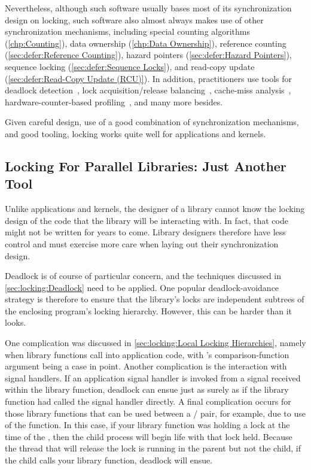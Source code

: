 Nevertheless, although such software usually bases most of its
synchronization design on locking, such software also almost always
makes use of other synchronization mechanisms, including
special counting algorithms (\cref{chp:Counting}),
data ownership (\cref{chp:Data Ownership}),
reference counting (\cref{sec:defer:Reference Counting}),
hazard pointers (\cref{sec:defer:Hazard Pointers}),
sequence locking (\cref{sec:defer:Sequence Locks}), and
read-copy update (\cref{sec:defer:Read-Copy Update (RCU)}).
In addition, practitioners use tools for deadlock
detection~\cite{JonathanCorbet2006lockdep},
lock acquisition/release balancing~\cite{JonathanCorbet2004sparse},
cache-miss analysis~\cite{ValgrindHomePage},
hardware-counter-based profiling~\cite{LinuxKernelPerfWiki,OProfileHomePage},
and many more besides.

Given careful design, use of a good combination of synchronization
mechanisms, and good tooling, locking works quite well for applications
and kernels.

\subsection{Locking For Parallel Libraries: Just Another Tool}
\label{sec:locking:Locking For Parallel Libraries: Just Another Tool}

Unlike applications and kernels, the designer of a library cannot
know the locking design of the code that the library will be interacting
with.
In fact, that code might not be written for years to come.
Library designers therefore have less control and must exercise more
care when laying out their synchronization design.

Deadlock is of course of particular concern, and the techniques discussed
in \cref{sec:locking:Deadlock} need to be applied.
One popular deadlock-avoidance strategy is therefore to ensure that
the library's locks are independent subtrees of the enclosing program's
locking hierarchy.
However, this can be harder than it looks.

One complication was discussed in
\cref{sec:locking:Local Locking Hierarchies}, namely
when library functions call into application code, with 's
comparison-function argument being a case in point.
Another complication is the interaction with signal handlers.
If an application signal handler is invoked from a signal received within
the library function, deadlock can ensue just as surely as
if the library function had called the signal handler directly.
A final complication occurs for those library functions that can be used
between a / pair, for example, due to use of
the  function.
In this case, if your library function was holding a lock at the time of
the , then the child process will begin life with that lock held.
Because the thread that will release the lock is running in the parent
but not the child, if the child calls your library function, deadlock
will ensue.

